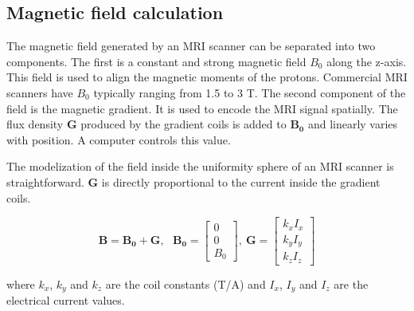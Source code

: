\documentclass[letterpaper, 10 pt, conference]{ieeeconf}  %
\begin{document}
\subsection{Magnetic field calculation}
\label{magfield}
The magnetic field generated by an MRI scanner can be separated into two components. The first is a constant and strong magnetic field $B_0$ along the z-axis. This field is used to align the magnetic moments of the protons. Commercial MRI scanners have $B_0$ typically ranging from 1.5 to 3 T. The second component of the field is the magnetic gradient. It is used to encode the MRI signal spatially. The flux density $\mathbf{G}$ produced by the gradient coils is added to $\mathbf{B_0}$ and linearly varies with position. A computer controls this value.\par
The modelization of the field inside the uniformity sphere of an MRI scanner is straightforward. $\mathbf{G}$ is directly proportional to the current inside the gradient coils. 

\begin{equation}
\mathbf{B}=\mathbf{B_0}+\mathbf{G},~~~
\mathbf{B_0}=\begin{bmatrix}
0\\ 
0\\ 
B_0
\end{bmatrix},~
\mathbf{G}=\begin{bmatrix}
k_x I_x\\ 
k_y I_y\\ 
k_z I_z
\end{bmatrix}
\label{magfield}
\end{equation}

where $k_x$, $k_y$ and $k_z$ are the coil constants (T/A) and $I_x$, $I_y$ and $I_z$ are the electrical current values.\par
\end{document}
